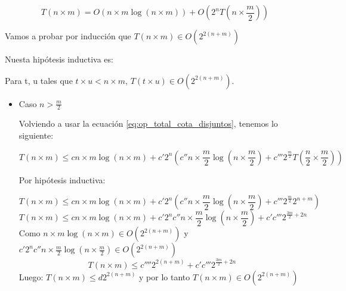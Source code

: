 \documentclass[a4paper, 12pt] {article}
\begin{document}
\begin{equation} \label{eq:op_total_cota_disjuntos}
T\left( n \times m\right) = O\left( n\times m \log \left( n\times m\right) \right) + O \left( 2^{n}T\left( n \times \frac{m}{2} \right) \right) 
\end{equation}

Vamos a probar por inducci\'on que $\textstyle T\left( n \times m \right) \in O\left( 2^{2\left( n+m\right)  }\right)$


Nuesta hip\'otesis inductiva es:

Para t, u tales que $ t \times u < n \times m $, $ T(t \times u) \in O\left( 2^{2\left( n + m\right) }\right) $.
\begin{itemize}
 \item Caso $n > \frac{m}{2} $

Volviendo a usar la ecuaci\'on \ref{eq:op_total_cota_disjuntos}, tenemos lo siguiente: 

\begin{equation}
T\left( n \times m \right) \leq c n\times m \log \left(n\times m \right) + c' 2^{n}\left( c'' n\times \frac{m}{2} \log \left( n \times \frac{m}{2} \right) + c''' 2^{\frac{m}{2}}T\left( \frac{n}{2} \times \frac{m}{2} \right) \right)
\end{equation}



Por hip\'otesis inductiva:


\begin{equation}
T\left( n \times m \right) \leq c n\times m \log \left(n\times m \right) + c' 2^{n}\left( c'' n\times \frac{m}{2} \log \left( n \times \frac{m}{2} \right) + c''' 2^{\frac{m}{2}} 2^{n+m} \right)
\end{equation}
\begin{equation}
T\left( n \times m \right) \leq c n\times m \log \left(n\times m \right) +  c' 2^{n}c'' n\times \frac{m}{2} \log \left( n \times \frac{m}{2} \right) + c'c''' 2^{\frac{3m}{2} + 2n}  
\end{equation}
Como $n\times m \log \left(n\times m \right) \in O\left(2^{2\left(n+m\right)}\right)$ y $ c' 2^{n}c'' n\times \frac{m}{2} \log \left( n \times \frac{m}{2} \right) \in O\left(2^{2\left(n+m\right)}\right)$
\begin{equation}
T\left( n \times m \right) \leq c'''' 2^{2\left(n+m\right)}+ c'c''' 2^{\frac{3m}{2} + 2n}  
\end{equation}
Luego:
$T\left( n \times m \right) \leq d 2^{2\left(n+m\right)}$ y por lo tanto $T\left( n\times m \right) \in O\left( 2^{2\left(n+m\right)}\right)$




\end{itemize}
\end{document}
